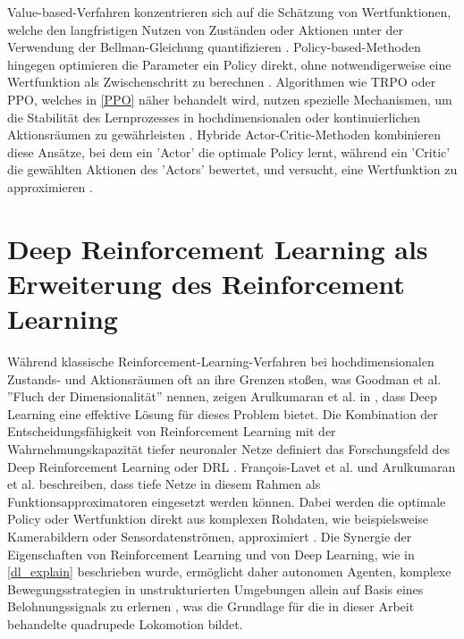Value-based-Verfahren konzentrieren sich auf die Schätzung von Wertfunktionen, welche den langfristigen Nutzen von Zuständen oder Aktionen unter der Verwendung der Bellman-Gleichung quantifizieren \cite{sutton2018reinforcement, ozalpAdvancementsDeepReinforcement2024}. \newline
Policy-based-Methoden hingegen optimieren die Parameter ein Policy direkt, ohne notwendigerweise eine Wertfunktion als Zwischenschritt zu berechnen \cite{sutton2018reinforcement, ozalpAdvancementsDeepReinforcement2024}. Algorithmen wie TRPO oder PPO, welches in \autoref{PPO} näher behandelt wird, nutzen spezielle Mechanismen, um die Stabilität des Lernprozesses in hochdimensionalen oder kontinuierlichen Aktionsräumen zu gewährleisten \cite{ozalpAdvancementsDeepReinforcement2024, arulkumaranDRL2017}. \newline
Hybride Actor-Critic-Methoden kombinieren diese Ansätze, bei dem ein 'Actor' die optimale Policy lernt, während ein 'Critic' die gewählten Aktionen des 'Actors' bewertet, und versucht, eine Wertfunktion zu approximieren \cite{sutton2018reinforcement, arulkumaranDRL2017}.
\section{Deep Reinforcement Learning als Erweiterung des Reinforcement Learning}
Während klassische Reinforcement-Learning-Verfahren bei hochdimensionalen Zustands- und Aktionsräumen oft an ihre Grenzen stoßen, was Goodman et al. \cite{Goodfellow-et-al-2016} ''Fluch der Dimensionalität'' nennen, zeigen Arulkumaran et al. in \cite{arulkumaranDRL2017}, dass Deep Learning eine effektive Lösung für dieses Problem bietet. Die Kombination der Entscheidungsfähigkeit von Reinforcement Learning mit der Wahrnehmungskapazität tiefer neuronaler Netze definiert das Forschungsfeld des Deep Reinforcement Learning oder DRL \cite{francois-lavetIntroductionDeepReinforcement2018, arulkumaranDRL2017, yuRewardModelsDeep2025}. \newline
François-Lavet et al. \cite{francois-lavetIntroductionDeepReinforcement2018} und Arulkumaran et al. \cite{arulkumaranDRL2017} beschreiben, dass tiefe Netze in diesem Rahmen als Funktionsapproximatoren eingesetzt werden können. Dabei werden die optimale Policy oder Wertfunktion direkt aus komplexen Rohdaten, wie beispielsweise Kamerabildern oder Sensordatenströmen, approximiert \cite{levineEndtoEndTrainingDeep2016, mnihHumanlevelControlDeep2015}. \newline
Die Synergie der Eigenschaften von Reinforcement Learning und von Deep Learning, wie in \autoref{dl_explain} beschrieben wurde, ermöglicht daher autonomen Agenten, komplexe Bewegungsstrategien in unstrukturierten Umgebungen allein auf Basis eines Belohnungssignals zu erlernen \cite{arulkumaranDRL2017, hwangboLearningAgileDynamic2019, tangDeepReinforcementLearning2024}, was die Grundlage für die in dieser Arbeit behandelte quadrupede Lokomotion bildet.

